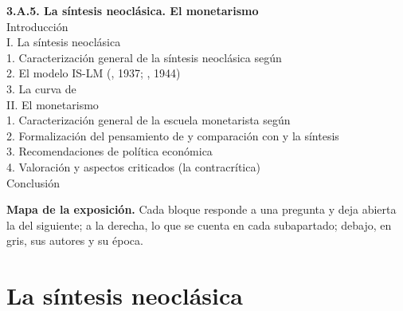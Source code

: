 \documentclass[11pt]{article}
\begin{document}
\begin{esquema}[unbreakable]
\textbf{3.A.5. La síntesis neoclásica. El monetarismo}\\[2pt]
Introducción\\
I. La síntesis neoclásica\\
\hspace*{1.5em}1. Caracterización general de la síntesis neoclásica según \\
\hspace*{1.5em}2. El modelo IS-LM (, 1937; , 1944)\\
\hspace*{1.5em}3. La curva de \\
II. El monetarismo\\
\hspace*{1.5em}1. Caracterización general de la escuela monetarista según \\
\hspace*{1.5em}2. Formalización del pensamiento de  y comparación con  y la síntesis\\
\hspace*{1.5em}3. Recomendaciones de política económica\\
\hspace*{1.5em}4. Valoración y aspectos criticados (la contracrítica)\\
Conclusión
\end{esquema}

\begin{anotaciones}
\textbf{Mapa de la exposición.} Cada bloque responde a una pregunta y deja abierta la del siguiente; a la derecha, lo que se cuenta en cada subapartado; debajo, en gris, sus autores y su época.
\begin{infografiacaja}
\caption{Mapa del tema: la pregunta de cada bloque, sus subapartados y el hilo que los une}\label{figu:mapa-tema}
\end{infografiacaja}
\end{anotaciones}



\section{La síntesis neoclásica}\label{sec:sintesis}
\end{document}

